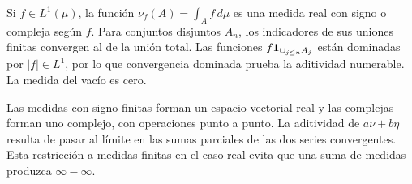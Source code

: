 \begin{ejemplo}
Si $f\in L^1(\mu)$, la función $\nu_f(A)=\int_A f\,d\mu$ es una medida real con signo o compleja según $f$. Para conjuntos disjuntos $A_n$, los indicadores de sus uniones finitas convergen al de la unión total. Las funciones $f\mathbf1_{\cup_{j\le n}A_j}$ están dominadas por $|f|\in L^1$, por lo que convergencia dominada prueba la aditividad numerable. La medida del vacío es cero.
\end{ejemplo}
Las medidas con signo finitas forman un espacio vectorial real y las complejas forman uno complejo, con operaciones punto a punto. La aditividad de $a\nu+b\eta$ resulta de pasar al límite en las sumas parciales de las dos series convergentes. Esta restricción a medidas finitas en el caso real evita que una suma de medidas produzca $\infty-\infty$.


